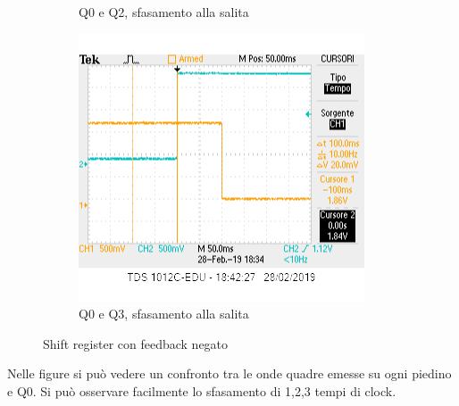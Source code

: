 \documentclass[10pt,a4paper]{article}
\begin{document}
\begin{figure}[h]
\begin{subfigure}[b]{0.4\linewidth}
		\caption{Q0 e Q2, sfasamento alla salita}
	\end{subfigure}
	\begin{subfigure}[b]{0.4\linewidth}
		\includegraphics[width=\linewidth]{q0q3 sr.png}
		\caption{Q0 e Q3, sfasamento alla salita}
	\end{subfigure}
	\caption{Shift register con feedback negato}
\end{figure}

Nelle figure si può  vedere un confronto tra le onde quadre emesse su ogni piedino e Q0. Si può osservare facilmente lo sfasamento di 1,2,3 tempi di clock.
\end{document}
